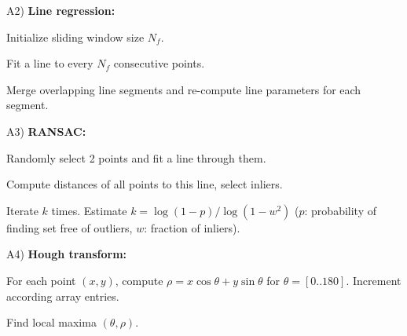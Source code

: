 \documentclass[landscape]{article}
\newcommand{\vmspace}{\vspace{-7pt}}
\newcommand{\vpspace}{\vspace{5pt}}
\begin{document}
\begin{multicols}{3}
\vpspace

\begin{minipage}{\columnwidth}
  A2) \textbf{Line regression:}
  \begin{compactenum}
  \item Initialize sliding window size $N_f$.
  \item Fit a line to every $N_f$ consecutive points.
  \item Merge overlapping line segments and re-compute line parameters for each
    segment.
  \end{compactenum}
\end{minipage}

\vpspace

\begin{minipage}{\columnwidth}
  A3) \textbf{RANSAC:}
  \begin{compactenum}
  \item Randomly select 2 points and fit a line through them.
  \item Compute distances of all points to this line, select inliers.
  \item Iterate $k$ times. Estimate $k=\log(1-p)/\log(1-w^2)$ ($p$:
    probability of finding set free of outliers, $w$: fraction of inliers).
  \end{compactenum}
\end{minipage}

\vpspace

\begin{minipage}{\columnwidth}
  A4) \textbf{Hough transform:}
  \begin{compactenum}
  \item For each point $(x,y)$, compute $\rho = x\cos\theta + y\sin\theta$ for
    $\theta=[0..180]$. Increment according array entries.
  \item Find local maxima $(\theta,\rho)$.
  \end{compactenum}
\end{minipage}





\end{multicols}
\end{document}
